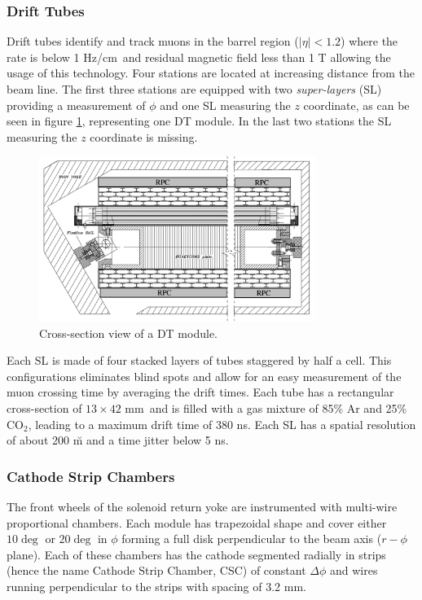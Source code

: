 \subsubsection*{Drift Tubes}

Drift tubes identify and track muons in the barrel region ($|\eta| < 1.2$) where the rate is below 1 Hz/cm\sq ~and residual magnetic field less than 1 T allowing the usage of this technology. Four stations are located at increasing distance from the beam line. The first three stations are equipped with two \emph{super-layers} (SL) providing a measurement of $\phi$ and one SL measuring the $z$ coordinate, as can be seen in figure \ref{fig:dt_module}, representing one DT module. In the last two stations the SL measuring the $z$ coordinate is missing. 

\begin{figure}
\begin{center}
\includegraphics[angle=-0,width=0.8\textwidth]{2_LHC_and_CMS/pics/cms_dt.png}
\caption{Cross-section view of a DT module.
\label{fig:dt_module}
}
\end{center}
\end{figure}


Each SL is made of four stacked layers of tubes staggered by half a cell. This configurations eliminates blind spots and allow for an easy measurement of the muon crossing time by averaging the drift times. Each tube has a rectangular cross-section of $13\times42$ mm\sq ~and is filled with a gas mixture of 85\% Ar and 25\% CO$_2$, leading to a maximum drift time of 380 ns. Each SL has a spatial resolution of about 200 \u m and a time jitter below 5 ns.

\subsubsection*{Cathode Strip Chambers}

The front wheels of the solenoid return yoke are instrumented with multi-wire proportional chambers. Each module has trapezoidal shape and cover either $10\deg$ or $20\deg$ in $\phi$ forming a full disk perpendicular to the beam axis ($r-\phi$ plane). Each of these chambers has the cathode segmented radially in strips (hence the name Cathode Strip Chamber, CSC) of constant $\Delta\phi$ and wires running perpendicular to the strips with spacing of 3.2 mm. 

